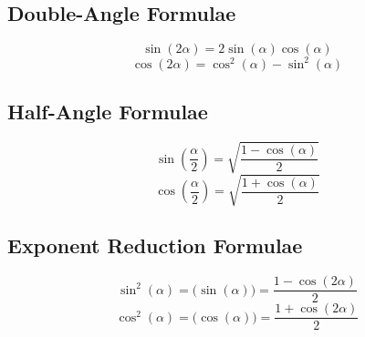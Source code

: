 \subsection{Double-Angle Formulae}\label{subsec:Double-Angle Formulae}
\begin{equation}\label{eq:Sin Double-Angle}
  \sin \left( 2 \alpha \right) = 2 \sin \left( \alpha \right) \cos \left( \alpha \right)
\end{equation}
\begin{equation}\label{eq:Cos Double-Angle}
  \cos \left( 2 \alpha \right) = \cos^{2} \left( \alpha \right) - \sin^{2} \left( \alpha \right)
\end{equation}

\subsection{Half-Angle Formulae}\label{subsec:Half-Angle Formulae}
\begin{equation}\label{eq:Sin Half-Angle}
  \sin \left( \frac{\alpha}{2} \right) = \sqrt{\frac{1-\cos \left( \alpha \right)}{2}}
\end{equation}
\begin{equation}\label{eq:Cos Half-Angle}
  \cos \left( \frac{\alpha}{2} \right) = \sqrt{\frac{1+\cos \left( \alpha \right)}{2}}
\end{equation}

\subsection{Exponent Reduction Formulae}\label{subsec:Exponent Reduction Formula}
\begin{equation}\label{eq:Sin Squared Reduction}
  \sin^{2}(\alpha) = \bigl( \sin (\alpha) \bigr) = \frac{1 - \cos(2 \alpha)}{2}
\end{equation}
\begin{equation}\label{eq:Cos Squared Reduction}
  \cos^{2}(\alpha) = \bigl( \cos (\alpha) \bigr)= \frac{1 + \cos(2 \alpha)}{2}
\end{equation}

